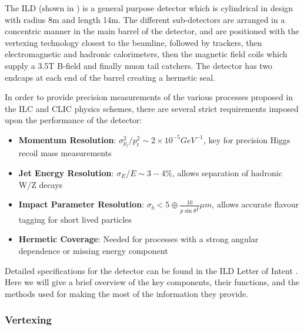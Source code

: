 The ILD (shown in ) is a general purpose detector which is cylindrical in design with radius 8m and length 14m. The different sub-detectors are arranged in a concentric manner in the main barrel of the detector, and are positioned with the vertexing technology closest to the beamline, followed by trackers, then electromagnetic and hadronic calorimeters, then the magnetic field coils which supply a 3.5T B-field and finally muon tail catchers. The detector has two endcaps at each end of the barrel creating a hermetic seal.

In order to provide precision measurements of the various processes proposed in the \ac{ILC} and \ac{CLIC} physics schemes, there are several strict requirements imposed upon the performance of the detector:

\begin{itemize}

\item \textbf{Momentum Resolution}: $\sigma_{p_t}^2/ p_{t}^2 \sim 2 \times 10^{-5} GeV^{-1}$, key for precision Higgs recoil mass measurements

\item \textbf{Jet Energy Resolution}: $\sigma_E/E \sim 3-4\%$, allows separation of hadronic W/Z decays

\item \textbf{Impact Parameter Resolution}: $\sigma_{b} < 5 \oplus \frac{10}{p\sin\theta^{\frac{3}{2}}}\mu m$, allows accurate flavour tagging for short lived particles

\item \textbf{Hermetic Coverage}: Needed for processes with a strong angular dependence or missing energy component 

\end{itemize}

Detailed specifications for the detector can be found in the \ac{ILD} Letter of Intent \cite{ILD}. Here we will give a brief overview of the key components, their functions, and the methods used for making the most of the information they provide.

\subsubsection{Vertexing}

